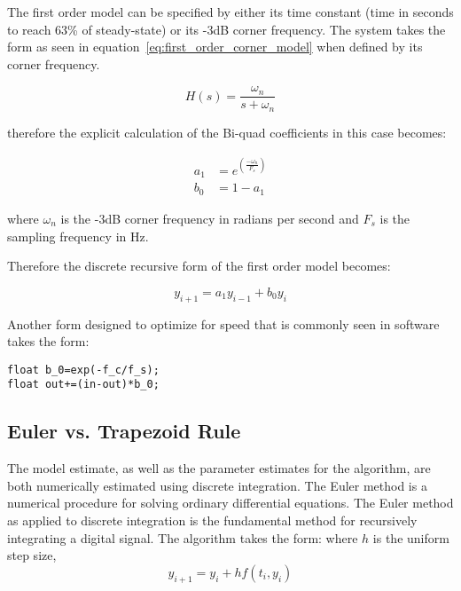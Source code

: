 The first order model can be specified by either its time constant (time in seconds to reach 63\% of steady-state) or its -3dB corner frequency.  The system takes the form as seen in equation~\ref{eq:first_order_corner_model} when defined by its corner frequency.

\begin{equation}\label{eq:first_order_corner_model}
H(s)=\frac{\omega_n}{s+\omega_n}
\end{equation}

therefore the explicit calculation of the Bi-quad coefficients in this case becomes:

\begin{equation}\label{eq:first_order_coeffieicnts}
\begin{split}
 a_1&=e^{\left(\frac{-\omega_n}{F_s}\right)}  \\
 b_0&=1-a_1
\end{split}
\end{equation}

where $\omega_n$ is the -3dB corner frequency in radians per second and $F_s$ is the sampling frequency in Hz.

Therefore the discrete recursive form of the first order model becomes:

\begin{equation}
y_{i+1}=a_1y_{i-1}+b_0y_i
\end{equation}

Another form designed to optimize for speed that is commonly seen in software takes the form:

\begin{lstlisting}
float b_0=exp(-f_c/f_s);
float out+=(in-out)*b_0;
\end{lstlisting}

\subsection{Euler vs. Trapezoid Rule}

The model estimate, as well as the parameter estimates for the \Lone algorithm, are both numerically estimated using discrete integration.  The Euler method is a numerical procedure for solving ordinary differential equations. The Euler method as applied to discrete integration is the fundamental method for recursively integrating a digital signal.  The algorithm takes the form: \newline
where $h$ is the uniform step size,
\begin{equation}
y_{i+1}=y_i+hf(t_i,y_i)
\end{equation}


